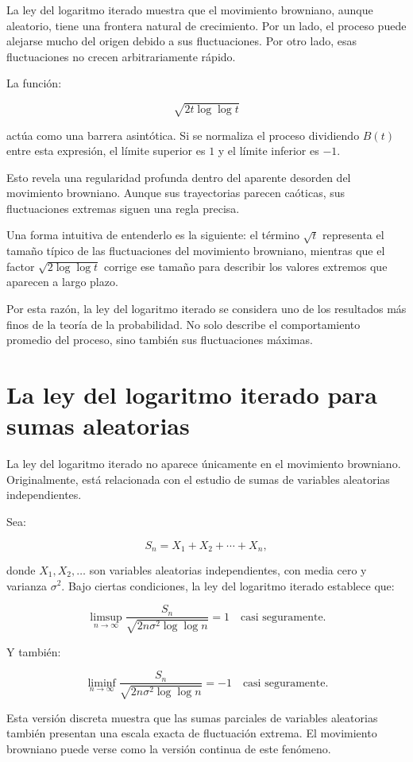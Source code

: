 \documentclass[12pt]{article}
\begin{document}
La ley del logaritmo iterado muestra que el movimiento browniano, aunque aleatorio, tiene una frontera natural de crecimiento. Por un lado, el proceso puede alejarse mucho del origen debido a sus fluctuaciones. Por otro lado, esas fluctuaciones no crecen arbitrariamente rápido.

La función:

\[
\sqrt{2t\log\log t}
\]

actúa como una barrera asintótica. Si se normaliza el proceso dividiendo $B(t)$ entre esta expresión, el límite superior es $1$ y el límite inferior es $-1$.

Esto revela una regularidad profunda dentro del aparente desorden del movimiento browniano. Aunque sus trayectorias parecen caóticas, sus fluctuaciones extremas siguen una regla precisa.

Una forma intuitiva de entenderlo es la siguiente: el término $\sqrt{t}$ representa el tamaño típico de las fluctuaciones del movimiento browniano, mientras que el factor $\sqrt{2\log\log t}$ corrige ese tamaño para describir los valores extremos que aparecen a largo plazo.

Por esta razón, la ley del logaritmo iterado se considera uno de los resultados más finos de la teoría de la probabilidad. No solo describe el comportamiento promedio del proceso, sino también sus fluctuaciones máximas.

\section{La ley del logaritmo iterado para sumas aleatorias}

La ley del logaritmo iterado no aparece únicamente en el movimiento browniano. Originalmente, está relacionada con el estudio de sumas de variables aleatorias independientes.

Sea:

\[
S_n=X_1+X_2+\cdots+X_n,
\]

donde $X_1,X_2,\dots$ son variables aleatorias independientes, con media cero y varianza $\sigma^2$. Bajo ciertas condiciones, la ley del logaritmo iterado establece que:

\[
\limsup_{n\to\infty}
\frac{S_n}
{\sqrt{2n\sigma^2\log\log n}}
=1
\quad \text{casi seguramente}.
\]

Y también:

\[
\liminf_{n\to\infty}
\frac{S_n}
{\sqrt{2n\sigma^2\log\log n}}
=-1
\quad \text{casi seguramente}.
\]

Esta versión discreta muestra que las sumas parciales de variables aleatorias también presentan una escala exacta de fluctuación extrema. El movimiento browniano puede verse como la versión continua de este fenómeno.
\end{document}
